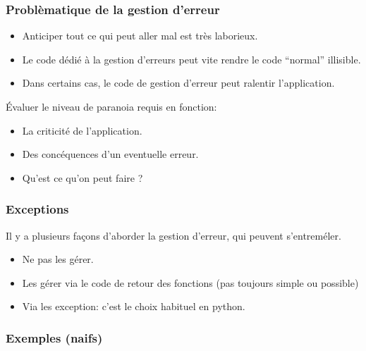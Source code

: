 \documentclass{beamer}
\begin{document}
\begin{frame}\frametitle{Problèmatique de la gestion d'erreur}
  \begin{itemize}
  \item Anticiper tout ce qui peut aller mal est très laborieux.
  \item Le code dédié à la gestion d'erreurs peut vite rendre le code ``normal'' illisible.
  \item Dans certains cas, le code de gestion d'erreur peut ralentir l'application.
  \end{itemize}
  Évaluer le niveau de paranoia requis en fonction:
  \begin{itemize}
  \item La criticité de l'application.
  \item Des concéquences d'un eventuelle erreur.
  \item Qu'est ce qu'on peut faire ?
  \end{itemize}
\end{frame}

\begin{frame}\frametitle{Exceptions}
  Il y a plusieurs façons d'aborder la gestion d'erreur, qui peuvent s'entreméler.
  \begin{itemize}
  \item Ne pas les gérer.
  \item Les gérer via le code de retour des fonctions (pas toujours simple ou possible)
  \item Via les exception: c'est le choix habituel en python.
  \end{itemize}
\end{frame}

\begin{frame}[fragile]\frametitle{Exemples (naifs)}
    
\end{frame}
\end{document}
